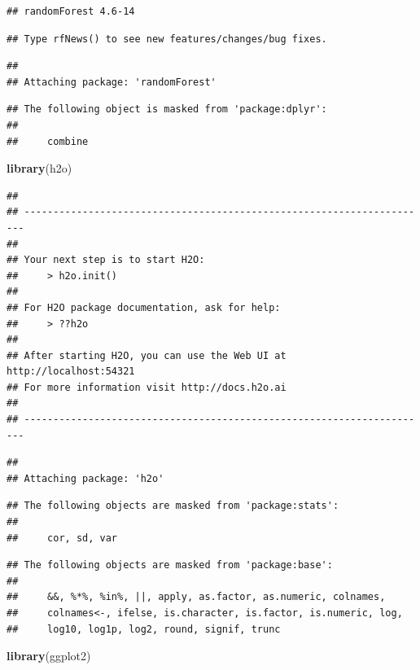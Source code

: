\documentclass[]{article}
\newenvironment{Shaded}{\begin{snugshade}}{\end{snugshade}}
\newcommand{\KeywordTok}[1]{\textcolor[rgb]{0.13,0.29,0.53}{\textbf{#1}}}
\newcommand{\NormalTok}[1]{#1}
\begin{document}
\begin{verbatim}
## randomForest 4.6-14
\end{verbatim}

\begin{verbatim}
## Type rfNews() to see new features/changes/bug fixes.
\end{verbatim}

\begin{verbatim}
## 
## Attaching package: 'randomForest'
\end{verbatim}

\begin{verbatim}
## The following object is masked from 'package:dplyr':
## 
##     combine
\end{verbatim}

\begin{Shaded}
\begin{Highlighting}[]
\KeywordTok{library}\NormalTok{(h2o)}
\end{Highlighting}
\end{Shaded}

\begin{verbatim}
## 
## ----------------------------------------------------------------------
## 
## Your next step is to start H2O:
##     > h2o.init()
## 
## For H2O package documentation, ask for help:
##     > ??h2o
## 
## After starting H2O, you can use the Web UI at http://localhost:54321
## For more information visit http://docs.h2o.ai
## 
## ----------------------------------------------------------------------
\end{verbatim}

\begin{verbatim}
## 
## Attaching package: 'h2o'
\end{verbatim}

\begin{verbatim}
## The following objects are masked from 'package:stats':
## 
##     cor, sd, var
\end{verbatim}

\begin{verbatim}
## The following objects are masked from 'package:base':
## 
##     &&, %*%, %in%, ||, apply, as.factor, as.numeric, colnames,
##     colnames<-, ifelse, is.character, is.factor, is.numeric, log,
##     log10, log1p, log2, round, signif, trunc
\end{verbatim}

\begin{Shaded}
\begin{Highlighting}[]
\KeywordTok{library}\NormalTok{(ggplot2)}
\end{Highlighting}
\end{Shaded}
\end{document}
